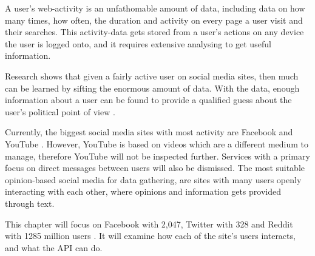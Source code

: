 A user's web-activity is an unfathomable amount of data, including data on how
many times, how often, the duration and activity on every page a user visit and
their searches. This activity-data gets stored from a user's actions on any
device the user is logged onto, and it requires extensive analysing to get
useful information.

Research shows that given a fairly active user on social media sites, then much
can be learned by sifting the enormous amount of data. With the data, enough
information about a user can be found to provide a qualified guess about the
user's political point of view \citep{Personality}.\nl

Currently, the biggest social media sites with most activity are Facebook and
YouTube \citep{SocialMediaStats}. However, YouTube is based on videos which are
a different medium to manage, therefore YouTube will not be inspected further.
Services with a primary focus on direct messages between users will also be
dismissed. The most suitable opinion-based social media for data gathering, are
sites with many users openly interacting with each other, where opinions and
information gets provided through text.\nl

This chapter will focus on Facebook with 2,047, Twitter with 328 and Reddit with
1285 million users \citep{FacebookPopularity}. It will examine how each of the
site's users interacts, and what the API can do.